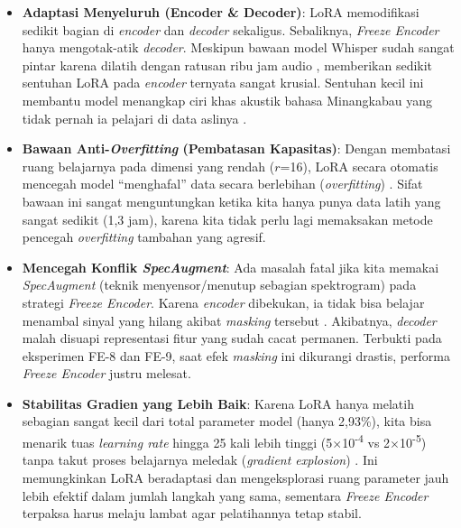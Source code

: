 \begin{itemize}
    \item \textbf{Adaptasi Menyeluruh (Encoder \& Decoder)}: LoRA memodifikasi sedikit bagian di \textit{encoder} dan \textit{decoder} sekaligus. Sebaliknya, \textit{Freeze Encoder} hanya mengotak-atik \textit{decoder}. Meskipun bawaan model Whisper sudah sangat pintar karena dilatih dengan ratusan ribu jam audio \cite{radford2023whisper}, memberikan sedikit sentuhan LoRA pada \textit{encoder} ternyata sangat krusial. Sentuhan kecil ini membantu model menangkap ciri khas akustik bahasa Minangkabau yang tidak pernah ia pelajari di data aslinya \cite{song2024lorawhisper}.

    \item \textbf{Bawaan Anti-\textit{Overfitting} (Pembatasan Kapasitas)}: Dengan membatasi ruang belajarnya pada dimensi yang rendah ($r$=16), LoRA secara otomatis mencegah model ``menghafal'' data secara berlebihan (\textit{overfitting}) \cite{hu2022lora}. Sifat bawaan ini sangat menguntungkan ketika kita hanya punya data latih yang sangat sedikit (1,3 jam), karena kita tidak perlu lagi memaksakan metode pencegah \textit{overfitting} tambahan yang agresif.

    \item \textbf{Mencegah Konflik \textit{SpecAugment}}: Ada masalah fatal jika kita memakai \textit{SpecAugment} (teknik menyensor/menutup sebagian spektrogram) pada strategi \textit{Freeze Encoder}. Karena \textit{encoder} dibekukan, ia tidak bisa belajar menambal sinyal yang hilang akibat \textit{masking} tersebut \cite{park2019specaugment}. Akibatnya, \textit{decoder} malah disuapi representasi fitur yang sudah cacat permanen. Terbukti pada eksperimen FE-8 dan FE-9, saat efek \textit{masking} ini dikurangi drastis, performa \textit{Freeze Encoder} justru melesat.

    \item \textbf{Stabilitas Gradien yang Lebih Baik}: Karena LoRA hanya melatih sebagian sangat kecil dari total parameter model (hanya 2,93\%), kita bisa menarik tuas \textit{learning rate} hingga 25 kali lebih tinggi (5$\times$10\textsuperscript{-4} vs 2$\times$10\textsuperscript{-5}) tanpa takut proses belajarnya meledak (\textit{gradient explosion}) \cite{pascanu2013difficulty}. Ini memungkinkan LoRA beradaptasi dan mengeksplorasi ruang parameter jauh lebih efektif dalam jumlah langkah yang sama, sementara \textit{Freeze Encoder} terpaksa harus melaju lambat agar pelatihannya tetap stabil.
\end{itemize}

